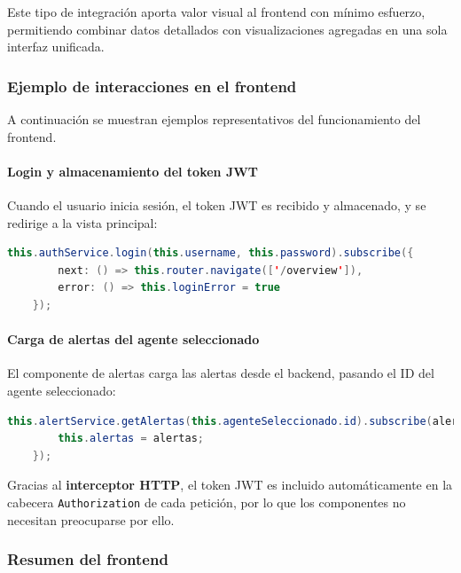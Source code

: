 \documentclass[11pt,a4paper,twoside]{report}
\begin{document}
Este tipo de integración aporta valor visual al frontend con mínimo esfuerzo, permitiendo combinar datos detallados con visualizaciones agregadas en una sola interfaz unificada.

\subsubsection{Ejemplo de interacciones en el frontend}

A continuación se muestran ejemplos representativos del funcionamiento del frontend.

\paragraph{Login y almacenamiento del token JWT}

Cuando el usuario inicia sesión, el token JWT es recibido y almacenado, y se redirige a la vista principal:

\begin{lstlisting}[language=Java, caption={Login y navegación tras autenticación}, label={lst:frontend-login}]
	this.authService.login(this.username, this.password).subscribe({
		next: () => this.router.navigate(['/overview']),
		error: () => this.loginError = true
	});
\end{lstlisting}

\paragraph{Carga de alertas del agente seleccionado}

El componente de alertas carga las alertas desde el backend, pasando el ID del agente seleccionado:

\begin{lstlisting}[language=Java, caption={Carga de alertas desde el servicio}, label={lst:frontend-alertas}]
	this.alertService.getAlertas(this.agenteSeleccionado.id).subscribe(alertas => {
		this.alertas = alertas;
	});
\end{lstlisting}

Gracias al \textbf{interceptor HTTP}, el token JWT es incluido automáticamente en la cabecera \texttt{Authorization} de cada petición, por lo que los componentes no necesitan preocuparse por ello.

\subsubsection{Resumen del frontend}
\end{document}
